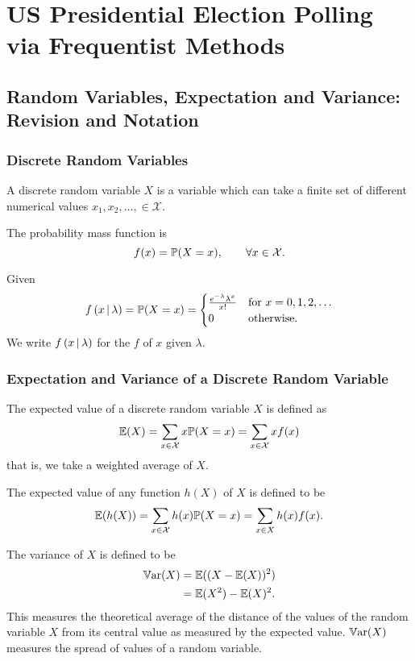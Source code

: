 \documentclass[10pt, a4paper]{article}
\begin{document}
\section{US Presidential Election Polling via Frequentist Methods}

\subsection{Random Variables,
Expectation and Variance:
Revision and Notation}

\subsubsection{Discrete Random Variables}
A discrete random variable $X$ is a variable which can take a finite set of different numerical values $x_1, x_2, \dotsc, \in \mathcal{X}$.

The probability mass function is
\[
f(x) = \P(X = x),\qquad\forall x \in \mathcal{X}.
\]

Given
\[
f\left(x \mmid \lambda\right) = \P(X = x) = \begin{cases}
    \frac{e ^ {-\lambda}\lambda ^ x}{x!} & \text{for } x = 0, 1, 2, \dotsc \\
    0 & \text{otherwise}.
\end{cases}
\]
We write $f\left(x \mmid \lambda\right)$ for the $f$ of $x$ given $\lambda$.

\subsubsection{Expectation and Variance of a Discrete Random Variable}
The expected value of a discrete random variable $X$ is defined as
\[
\E(X) = \sum_{x \in \mathcal{X}}x\P(X = x) = \sum_{x \in \mathcal{X}}xf(x)
\]
that is,
we take a weighted average of $X$.

The expected value of any function $h(X)$ of $X$ is defined to be
\[
\E(h(X)) = \sum_{x \in \mathcal{X}}h(x)\P(X = x) = \sum_{x \in X}h(x)f(x).
\]

The variance of $X$ is defined to be
\begin{align*}
    \Var(X) &= \E((X - \E(X)) ^ 2) \\
    &= \E(X ^ 2) - \E(X) ^ 2.
\end{align*}
This measures the theoretical average of the distance of the values of the random variable $X$ from its central value as measured by the expected value.
$\Var(X)$ measures the spread of values of a random variable.
\end{document}
